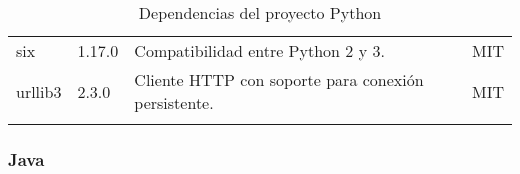 \begin{longtable}[]{@{}llll@{}}
    \begin{minipage}[t]{0.18\columnwidth}\raggedright\strut six \strut \end{minipage} & \begin{minipage}[t]{0.10\columnwidth}\raggedright\strut 1.17.0 \strut \end{minipage} & \begin{minipage}[t]{0.49\columnwidth}\raggedright\strut Compatibilidad entre Python 2 y 3. \strut \end{minipage} & \begin{minipage}[t]{0.11\columnwidth}\raggedright\strut MIT \strut \end{minipage} \tabularnewline

    \begin{minipage}[t]{0.18\columnwidth}\raggedright\strut urllib3 \strut \end{minipage} & \begin{minipage}[t]{0.10\columnwidth}\raggedright\strut 2.3.0 \strut \end{minipage} & \begin{minipage}[t]{0.49\columnwidth}\raggedright\strut Cliente HTTP con soporte para conexión persistente. \strut \end{minipage} & \begin{minipage}[t]{0.11\columnwidth}\raggedright\strut MIT \strut \end{minipage} \tabularnewline

    \bottomrule
    \caption{Dependencias del proyecto Python}
\end{longtable}


\subsubsection{Java}

